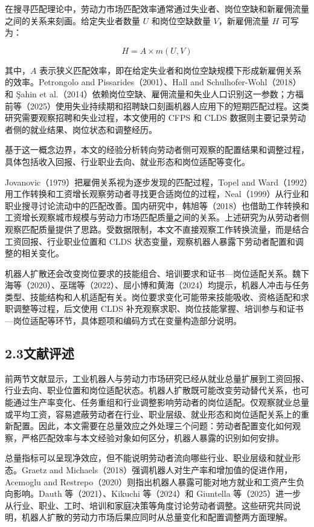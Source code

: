 在搜寻匹配理论中，劳动力市场匹配效率通常通过失业者、岗位空缺和新雇佣流量之间的关系来刻画。给定失业者数量 \(U\) 和岗位空缺数量 \(V\)，新雇佣流量 \(H\) 可写为：

\[H = A \times m(U,V)\]

其中，\(A\) 表示狭义匹配效率，即在给定失业者和岗位空缺规模下形成新雇佣关系的效率。Petrongolo and Pissarides（2001）、Hall and Schulhofer-Wohl（2018）和 Şahin et al.（2014）依赖岗位空缺、雇佣流量和失业人口识别这一参数；方福前等（2025）使用失业持续期和招聘缺口刻画机器人应用下的短期匹配过程。这类研究需要观察招聘和失业过程，本文使用的 CFPS 和 CLDS 数据则主要记录劳动者侧的就业结果、岗位状态和调整经历。

基于这一概念边界，本文的经验分析转向劳动者侧可观察的配置结果和调整过程，具体包括收入回报、行业职业去向、就业形态和岗位适配等变化。

Jovanovic（1979）把雇佣关系视为逐步发现的匹配过程，Topel and Ward（1992）用工作转换和工资增长观察劳动者寻找更合适岗位的过程，Neal（1999）从行业和职业搜寻讨论流动中的匹配改善。国内研究中，韩旭等（2018）也借助工作转换和工资增长观察城市规模与劳动力市场匹配质量之间的关系。上述研究为从劳动者侧观察匹配质量提供了思路。受数据限制，本文不直接观察工作转换流量，而是结合工资回报、行业职业位置和 CLDS 状态变量，观察机器人暴露下劳动者配置和调整的相关变化。

机器人扩散还会改变岗位要求的技能组合、培训要求和证书---岗位适配关系。魏下海等（2020）、巫瑞等（2022）、屈小博和黄海（2024）均提示，机器人冲击与任务类型、技能结构和人机适配有关。岗位要求变化可能带来技能吸收、资格适配和求职调整等过程，后文使用 CLDS 补充观察求职、岗位技能掌握、培训参与和证书---岗位适配等环节，具体题项和编码方式在变量构造部分说明。

\subsection{2.3文献评述}\label{ux6587ux732eux8bc4ux8ff0}

前两节文献显示，工业机器人与劳动力市场研究已经从就业总量扩展到工资回报、行业去向、职业位置和岗位适配状态。机器人扩散既可能改变劳动替代关系，也可能通过生产率变化、任务重组和行业调整影响劳动者的岗位适配。仅观察就业总量或平均工资，容易遮蔽劳动者在行业、职业层级、就业形态和岗位适配关系上的重新配置。因此，本文需要在总量效应之外处理三个问题：劳动者配置变化如何观察，严格匹配效率与本文经验对象如何区分，机器人暴露的识别如何安排。

总量指标可以呈现净效应，但不能说明劳动者流向哪些行业、职业层级和就业形态。Graetz and Michaels（2018）强调机器人对生产率和增加值的促进作用，Acemoglu and Restrepo（2020）则指出机器人暴露可能对地方就业和工资产生负向影响。Dauth 等（2021）、Kikuchi 等（2024）和 Giuntella 等（2025）进一步从行业、职业、工时、培训和家庭决策等角度讨论劳动者调整。这些研究共同说明，机器人扩散的劳动力市场后果应同时从总量变化和配置调整两方面理解。

